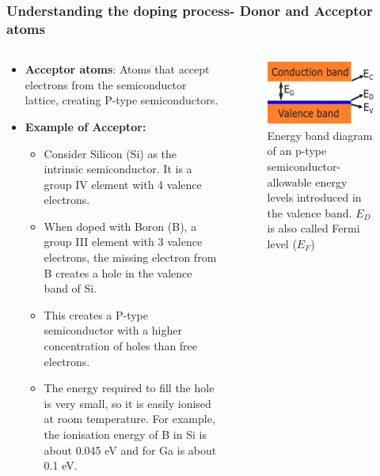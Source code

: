 \begin{frame}
	\frametitle{Understanding the doping process- Donor and \textbf{Acceptor atoms}}
    \begin{columns}
        \begin{column}{0.65\textwidth}
    \begin{itemize}
        \item \textbf{Acceptor atoms}: Atoms that accept electrons from the semiconductor lattice, creating P-type semiconductors.
        \item \textbf{Example of Acceptor:} 
        \begin{itemize}
            \item Consider Silicon (Si) as the intrinsic semiconductor. It is a group IV element with 4 valence electrons.
            \item When doped with Boron (B), a group III element with 3 valence electrons, the missing electron from B creates a hole in the valence band of Si.
            \item This creates a P-type semiconductor with a higher concentration of holes than free electrons.
            \item The energy required to fill the hole is very small, so it is easily ionised at room temperature. For example, the ionisation energy of B in Si is about 0.045 eV and for Ga is about 0.1 eV.
        \end{itemize}
    \end{itemize}
    \end{column}
    \hfill
    \begin{column}{0.35\textwidth}
        \begin{figure}
            \centering
            \includegraphics[scale=1.5]{fig/lec02/acceptor.pdf}
            \caption{Energy band diagram of an p-type semiconductor- allowable energy levels introduced in the valence band.  $E_D$ is also called Fermi level ($E_F$)}
        \end{figure}
    \end{column}
    \end{columns}
\end{frame}

